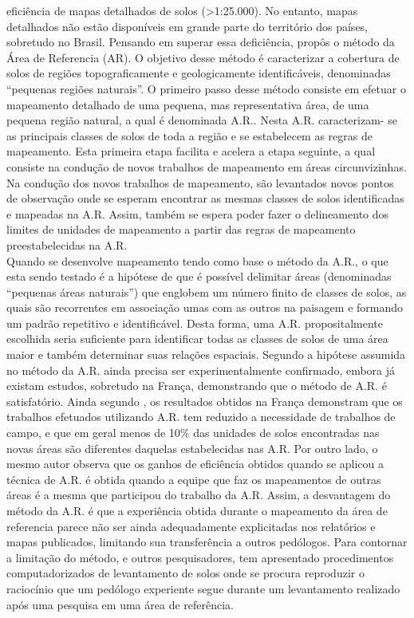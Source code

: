eficiência de mapas detalhados de solos (\textgreater{}1:25.000). No entanto, mapas detalhados não estão disponíveis em grande parte do território dos países, sobretudo no Brasil. Pensando em superar essa deficiência, \cite{Favrot:1981} propôs o método da Área de Referencia (AR). O objetivo desse método é caracterizar a cobertura de solos de regiões topograficamente e geologicamente identificáveis, denominadas ``pequenas regiões naturais''. O primeiro passo desse método consiste em efetuar o mapeamento detalhado de uma pequena, mas representativa área, de uma pequena região natural, a qual é denominada A.R.. Nesta A.R. caracterizam- se as principais classes de solos de toda a região e se estabelecem as regras de mapeamento. Esta primeira etapa facilita e acelera a etapa seguinte, a qual consiste na condução de novos trabalhos de mapeamento em áreas circunvizinhas. Na condução dos novos trabalhos de mapeamento, são levantados novos pontos de observação onde se esperam encontrar as mesmas classes de solos 
identificadas e mapeadas na A.R. Assim, também se espera poder fazer o delineamento dos limites de unidades de mapeamento a partir das regras de mapeamento preestabelecidas na A.R.\\
Quando se desenvolve mapeamento tendo como base o método da A.R., o que esta sendo testado é a hipótese de que é possível delimitar áreas (denominadas ``pequenas áreas naturais'') que englobem um número finito de classes de solos, as quais são recorrentes em associação umas com as outros na paisagem e formando um padrão repetitivo e identificável. Desta forma, uma A.R. propositalmente escolhida seria suficiente para identificar todas as classes de solos de uma área maior e também determinar suas relações espaciais. Segundo \cite{LagacherieEtAl:1995} a hipótese assumida no método da A.R. ainda precisa ser experimentalmente confirmado, embora já existam estudos, sobretudo na França, demonstrando que o método de A.R. é satisfatório. Ainda segundo \cite{LagacherieEtAl:1995}, os resultados obtidos na França
demonstram que os trabalhos efetuados utilizando A.R. tem reduzido a necessidade de trabalhos de campo, e que em geral menos de 10\% das unidades de solos encontradas nas novas áreas são diferentes daquelas estabelecidas nas A.R. Por outro lado, o mesmo autor observa que os ganhos de eficiência obtidos quando se aplicou a técnica de A.R. é obtida quando a equipe que faz os mapeamentos de outras áreas é a mesma que participou do trabalho da A.R. Assim, a desvantagem do método da A.R. é que a experiência obtida durante o mapeamento da área de referencia parece não ser ainda adequadamente explicitadas nos relatórios e mapas publicados, limitando sua transferência a outros pedólogos. Para contornar a limitação do método, \cite{LagacherieEtAl:1995} e outros pesquisadores, tem apresentado procedimentos computadorizados de levantamento de solos onde se procura reproduzir o raciocínio que um pedólogo experiente segue durante um levantamento realizado após uma pesquisa em uma área de referência.\\
